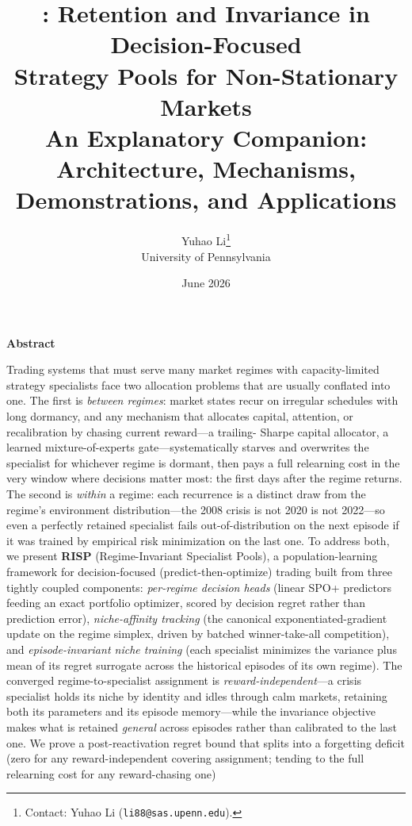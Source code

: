 \documentclass[10pt]{article}
\title{\textbf{\nm{}: Retention and Invariance in Decision-Focused\\
Strategy Pools for Non-Stationary Markets}\\[0.35cm]
\large An Explanatory Companion: Architecture, Mechanisms, Demonstrations,
and Applications}
\author{Yuhao Li\thanks{Contact: Yuhao Li (\texttt{li88@sas.upenn.edu}).}\\
University of Pennsylvania}
\date{June 2026}
\newcommand{\nm}{\textsc{RISP}}
\begin{document}
\maketitle

\begin{abstractbox}
\begin{center}
{\color{headblue}\large\bfseries Abstract}
\end{center}
\noindent
Trading systems that must serve many market regimes with capacity-limited
strategy specialists face two allocation problems that are usually conflated
into one. The first is \emph{between regimes}: market states recur on
irregular schedules with long dormancy, and any mechanism that allocates
capital, attention, or recalibration by chasing current reward---a trailing-%
Sharpe capital allocator, a learned mixture-of-experts gate---systematically
starves and overwrites the specialist for whichever regime is dormant,
then pays a full relearning cost in the very window where decisions matter
most: the first days after the regime returns. The second is \emph{within} a
regime: each recurrence is a distinct draw from the regime's environment
distribution---the 2008 crisis is not 2020 is not 2022---so even a perfectly
retained specialist fails out-of-distribution on the next episode if it was
trained by empirical risk minimization on the last one. To address both, we
present \textbf{\nm{}} (Regime-Invariant Specialist Pools), a population-learning framework
for decision-focused (predict-then-optimize) trading built from three
tightly coupled components: \emph{per-regime decision heads} (linear SPO+
predictors feeding an exact portfolio optimizer, scored by decision regret
rather than prediction error), \emph{niche-affinity tracking} (the canonical
exponentiated-gradient update on the regime simplex, driven by batched
winner-take-all competition), and \emph{episode-invariant niche training}
(each specialist minimizes the variance plus mean of its regret surrogate
across the historical episodes of its own regime). The converged
regime-to-specialist assignment is \emph{reward-independent}---a crisis
specialist holds its niche by identity and idles through calm markets,
retaining both its parameters and its episode memory---while the invariance
objective makes what is retained \emph{general} across episodes rather than
calibrated to the last one. We prove a post-reactivation regret bound that
splits into a forgetting deficit (zero for any reward-independent covering
assignment; tending to the full relearning cost for any reward-chasing one)

\end{abstractbox}
\end{document}
